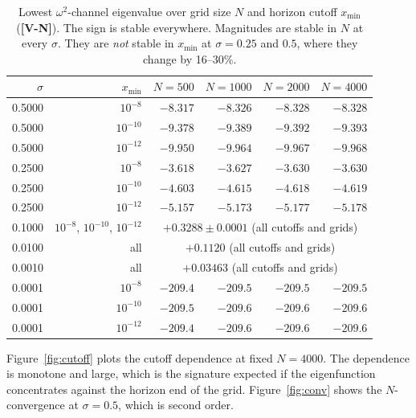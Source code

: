 \documentclass[11pt, a4paper]{article}
\newcommand{\VN}{\textcolor{vn}{\textbf{[V-N]}}}
\theoremstyle{remark}
\theoremstyle{definition}
\begin{document}
\begin{table}[H]
\centering
\caption{Lowest $\omega^2$-channel eigenvalue over grid size $N$ and horizon cutoff $x_{\min}$ (\VN). The sign is stable everywhere. Magnitudes are stable in $N$ at every $\sigma$. They are \emph{not} stable in $x_{\min}$ at $\sigma = 0.25$ and $0.5$, where they change by 16--30\%.}
\label{tab:conv}
\small
\begin{tabular}{@{}rrrrrr@{}}
\toprule
$\sigma$ & $x_{\min}$ & $N=500$ & $N=1000$ & $N=2000$ & $N=4000$ \\
\midrule
0.5000 & $10^{-8}$  & $-8.317$ & $-8.326$ & $-8.328$ & $-8.328$ \\
0.5000 & $10^{-10}$ & $-9.378$ & $-9.389$ & $-9.392$ & $-9.393$ \\
0.5000 & $10^{-12}$ & $-9.950$ & $-9.964$ & $-9.967$ & $-9.968$ \\
0.2500 & $10^{-8}$  & $-3.618$ & $-3.627$ & $-3.630$ & $-3.630$ \\
0.2500 & $10^{-10}$ & $-4.603$ & $-4.615$ & $-4.618$ & $-4.619$ \\
0.2500 & $10^{-12}$ & $-5.157$ & $-5.173$ & $-5.177$ & $-5.178$ \\
0.1000 & $10^{-8}$, $10^{-10}$, $10^{-12}$ & \multicolumn{4}{c}{$+0.3288 \pm 0.0001$ (all cutoffs and grids)} \\
0.0100 & all & \multicolumn{4}{c}{$+0.1120$ (all cutoffs and grids)} \\
0.0010 & all & \multicolumn{4}{c}{$+0.03463$ (all cutoffs and grids)} \\
0.0001 & $10^{-8}$  & $-209.4$ & $-209.5$ & $-209.5$ & $-209.5$ \\
0.0001 & $10^{-10}$ & $-209.5$ & $-209.6$ & $-209.6$ & $-209.6$ \\
0.0001 & $10^{-12}$ & $-209.4$ & $-209.6$ & $-209.6$ & $-209.6$ \\
\bottomrule
\end{tabular}
\end{table}

Figure~\ref{fig:cutoff} plots the cutoff dependence at fixed $N=4000$. The dependence is monotone and large, which is the signature expected if the eigenfunction concentrates against the horizon end of the grid. Figure~\ref{fig:conv} shows the $N$-convergence at $\sigma=0.5$, which is second order.
\end{document}
